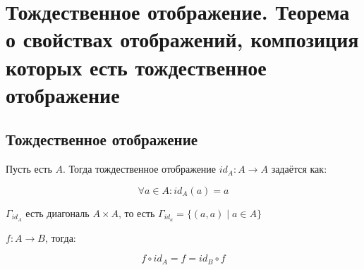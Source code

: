 ﻿\section{Тождественное отображение. Теорема о свойствах отображений, композиция которых есть
тождественное отображение}

\subsection{Тождественное отображение}

\begin{Def} Пусть есть $A$. Тогда тождественное отображение $id_{A}: A \to A$ задаётся как:

\[\forall a \in A\colon id_A(a) = a\]

$\Gamma_{id_A}$ есть диагональ $A \times A$, то есть $\Gamma_{id_a} = \{(a, a) \mid a \in A\}$
\end{Def}

\begin{theorem}{}
$f: A \to B$, тогда:

\[f \circ id_A = f =  id_B \circ f\]
\end{theorem}

